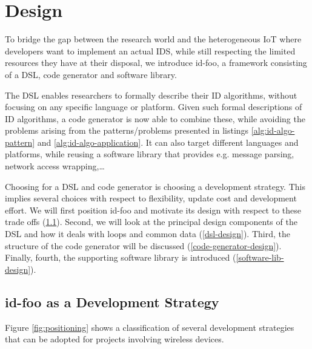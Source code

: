 \documentclass[conference]{IEEEtran}
\newcommand{\NAME}{id-foo\xspace}
\begin{document}
\section{Design}
\label{design}

To bridge the gap between the research world and the heterogeneous IoT where
developers want to implement an actual IDS, while still respecting the limited
resources they have at their disposal, we introduce \NAME, a framework
consisting of a DSL, code generator and software library.

The DSL enables researchers to formally describe their ID algorithms, without
focusing on any specific language or platform. Given such formal descriptions
of ID algorithms, a code generator is now able to combine these, while avoiding
the problems arising from the patterns/problems presented in listings
\ref{alg:id-algo-pattern} and \ref{alg:id-algo-application}. It can also target
different languages and platforms, while reusing a software library that
provides e.g. message parsing, network access wrapping,\dots

Choosing for a DSL and code generator is choosing a development strategy. This
implies several choices with respect to flexibility, update cost and
development effort. We will first position \NAME and motivate its design with
respect to these trade offs (\ref{positioning}). Second, we will look at the
principal design components of the DSL and how it deals with loops and common
data (\ref{dsl-design}). Third, the structure of the code generator will be
discussed (\ref{code-generator-design}). Finally, fourth, the supporting
software library is introduced (\ref{software-lib-design}).

\subsection{\NAME as a Development Strategy}
\label{positioning}

Figure \ref{fig:positioning} shows a classification of several development
strategies that can be adopted for projects involving wireless devices.

\newcommand{\ball}[5][above,yshift=+5pt]{
\tdplottransformmainscreen{#2}{#3}{#4}
\shadedraw[tdplot_screen_coords, ball color=lightgray,draw=lightgray,shading angle=-90]
  (\tdplotresx,\tdplotresy) circle (0.20)
  node[text=gray,font=\footnotesize,#1]{#5};
}
\end{document}
